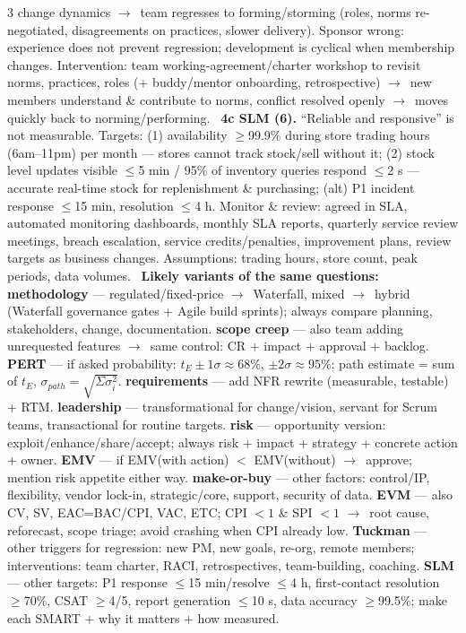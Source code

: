 \documentclass[a4paper,landscape]{article}
\newcommand{\concept}[1]{\textbf{#1}}
\newcommand{\lbl}[1]{\textbf{#1}}
\newcommand{\kh}[1]{{\setlength{\fboxsep}{0.5pt}\colorbox{keyhlcolor}{#1}}}
\newcommand{\ra}{$\rightarrow$}
\begin{document}
\begin{multicols}{3}
change dynamics \ra\ team \kh{regresses to forming/storming} (roles, norms re-negotiated, disagreements on practices, slower delivery). Sponsor wrong: experience does not prevent regression; development is cyclical when membership changes. Intervention: \kh{team working-agreement/charter workshop} to revisit norms, practices, roles (+ buddy/mentor onboarding, retrospective) \ra\ new members understand \& contribute to norms, conflict resolved openly \ra\ moves quickly back to norming/performing. \textbullet\ \lbl{4c SLM (6).} ``Reliable and responsive'' is not measurable. Targets: (1) \kh{availability $\ge$99.9\%} during store trading hours (6am--11pm) per month --- stores cannot track stock/sell without it; (2) \kh{stock level updates visible $\le$5 min} / 95\% of inventory queries respond $\le$2 s --- accurate real-time stock for replenishment \& purchasing; (alt) P1 incident response $\le$15 min, resolution $\le$4 h. Monitor \& review: agreed in SLA, automated monitoring dashboards, monthly SLA reports, quarterly service review meetings, breach escalation, service credits/penalties, improvement plans, review targets as business changes. Assumptions: trading hours, store count, peak periods, data volumes. \textbullet\ \lbl{Likely variants of the same questions:} \concept{methodology} --- regulated/fixed-price \ra\ Waterfall, mixed \ra\ hybrid (Waterfall governance gates + Agile build sprints); always compare planning, stakeholders, change, documentation. \concept{scope creep} --- also team adding unrequested features \ra\ same control: CR + impact + approval + backlog. \concept{PERT} --- if asked probability: $t_E\pm1\sigma\approx68\%$, $\pm2\sigma\approx95\%$; path estimate = sum of $t_E$, $\sigma_{path}=\sqrt{\Sigma\sigma_i^2}$. \concept{requirements} --- add NFR rewrite (measurable, testable) + RTM. \concept{leadership} --- transformational for change/vision, servant for Scrum teams, transactional for routine targets. \concept{risk} --- opportunity version: exploit/enhance/share/accept; always risk + impact + strategy + concrete action + owner. \concept{EMV} --- if EMV(with action) $<$ EMV(without) \ra\ approve; mention risk appetite either way. \concept{make-or-buy} --- other factors: control/IP, flexibility, vendor lock-in, strategic/core, support, security of data. \concept{EVM} --- also CV, SV, EAC=BAC/CPI, VAC, ETC; CPI $<1$ \& SPI $<1$ \ra\ root cause, reforecast, scope triage; avoid crashing when CPI already low. \concept{Tuckman} --- other triggers for regression: new PM, new goals, re-org, remote members; interventions: team charter, RACI, retrospectives, team-building, coaching. \concept{SLM} --- other targets: P1 response $\le$15 min/resolve $\le$4 h, first-contact resolution $\ge$70\%, CSAT $\ge$4/5, report generation $\le$10 s, data accuracy $\ge$99.5\%; make each SMART + why it matters + how measured.\par

\end{multicols}
\end{document}
